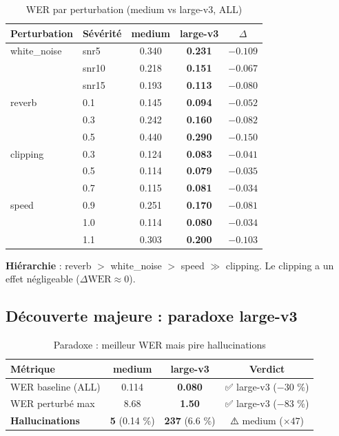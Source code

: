 \documentclass[11pt,a4paper]{article}
\begin{document}
\begin{table}[h]
\centering
\caption{WER par perturbation (medium vs large-v3, ALL)}
\label{tab:robustness}
\begin{tabular}{llcc c}
\toprule
\textbf{Perturbation} & \textbf{Sévérité} & \textbf{medium} & \textbf{large-v3} & \textbf{$\Delta$} \\
\midrule
white\_noise & snr5  & 0.340 & \textbf{0.231} & $-0.109$ \\
             & snr10 & 0.218 & \textbf{0.151} & $-0.067$ \\
             & snr15 & 0.193 & \textbf{0.113} & $-0.080$ \\
\midrule
reverb       & 0.1   & 0.145 & \textbf{0.094} & $-0.052$ \\
             & 0.3   & 0.242 & \textbf{0.160} & $-0.082$ \\
             & 0.5   & 0.440 & \textbf{0.290} & $-0.150$ \\
\midrule
clipping     & 0.3   & 0.124 & \textbf{0.083} & $-0.041$ \\
             & 0.5   & 0.114 & \textbf{0.079} & $-0.035$ \\
             & 0.7   & 0.115 & \textbf{0.081} & $-0.034$ \\
\midrule
speed        & 0.9   & 0.251 & \textbf{0.170} & $-0.081$ \\
             & 1.0   & 0.114 & \textbf{0.080} & $-0.034$ \\
             & 1.1   & 0.303 & \textbf{0.200} & $-0.103$ \\
\bottomrule
\end{tabular}
\end{table}

\textbf{Hiérarchie} : reverb $>$ white\_noise $>$ speed $\gg$ clipping.
Le clipping a un effet négligeable ($\Delta \text{WER} \approx 0$).

\subsection{Découverte majeure : paradoxe large-v3}

\begin{table}[h]
\centering
\caption{Paradoxe : meilleur WER mais pire hallucinations}
\label{tab:paradox}
\begin{tabular}{lccc}
\toprule
\textbf{Métrique} & \textbf{medium} & \textbf{large-v3} & \textbf{Verdict} \\
\midrule
WER baseline (ALL) & 0.114 & \textbf{0.080} & ✅ large-v3 ($-30$ \%) \\
WER perturbé max   & 8.68  & \textbf{1.50}  & ✅ large-v3 ($-83$ \%) \\
\textbf{Hallucinations} & \textbf{5} (0.14 \%) & \textbf{237} (6.6 \%) & ⚠️ medium ($\times 47$) \\
\bottomrule
\end{tabular}
\end{table}
\end{document}
